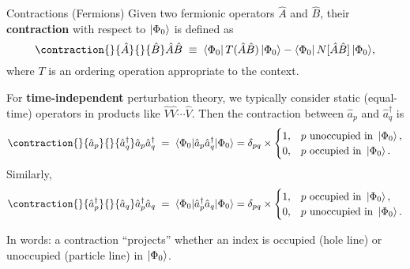 \documentclass[aspectratio=169]{beamer}
\begin{document}
\begin{frame}{Contractions (Fermions)}
Given two fermionic operators $\hat{A}$ and $\hat{B}$, their
\textbf{contraction} with respect to $\ket{\Phi_0}$ is defined as
\begin{equation}
    \contraction{}{\hat{A}}{}{\hat{B}}
    \hat{A}\hat{B}
    \;\equiv\;
    \langle \Phi_0 | \, T(\hat{A}\hat{B}) \, | \Phi_0 \rangle
    - \langle \Phi_0 | \, N[\hat{A}\hat{B}] \, | \Phi_0 \rangle,
\end{equation}
where $T$ is an ordering operation appropriate to the context.

For \textbf{time-independent} perturbation theory,
we typically consider static (equal-time) operators in products like
$\hat{V}\hat{V}\cdots\hat{V}$.
Then the contraction between $\hat{a}_p$ and $\hat{a}^\dagger_q$ is
\begin{equation}
    \contraction{}{\hat{a}_p}{}{\hat{a}^\dagger_q}
    \hat{a}_p \hat{a}^\dagger_q
    \;=\;
    \langle \Phi_0 | \hat{a}_p \hat{a}^\dagger_q | \Phi_0 \rangle
    =
    \delta_{pq} \times
    \begin{cases}
        1, & p \text{ unoccupied in } \ket{\Phi_0}, \\
        0, & p \text{ occupied in } \ket{\Phi_0}.
    \end{cases}
\end{equation}
Similarly,
\begin{equation}
    \contraction{}{\hat{a}^\dagger_p}{}{\hat{a}_q}
    \hat{a}^\dagger_p \hat{a}_q
    \;=\;
    \langle \Phi_0 | \hat{a}^\dagger_p \hat{a}_q | \Phi_0 \rangle
    =
    \delta_{pq} \times
    \begin{cases}
        1, & p \text{ occupied in } \ket{\Phi_0}, \\
        0, & p \text{ unoccupied in } \ket{\Phi_0}.
    \end{cases}
\end{equation}

In words: a contraction ``projects'' whether an index is occupied
(hole line) or unoccupied (particle line) in $\ket{\Phi_0}$.
\end{frame}
\end{document}

